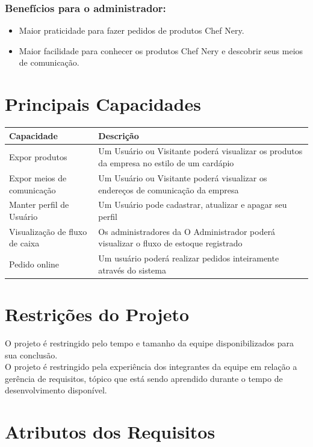 \begin{apendicesenv}
\begin{itemize}
\end{itemize}

\subsubsection{Benefícios para o administrador:}
\begin{itemize}

\item Maior praticidade para fazer pedidos de produtos Chef Nery.
\item Maior facilidade para conhecer os produtos Chef Nery e descobrir seus meios de comunicação.

\end{itemize}


{\large {\section { Principais Capacidades } } }

\begin{tabular}{|l|p{3in}|}
  \hline
  \textbf{Capacidade} & \textbf{Descrição} \\ \hline
  Expor produtos & Um Usuário ou Visitante poderá visualizar os produtos da empresa no estilo de um cardápio \\ \hline
  Expor meios de comunicação & Um Usuário ou Visitante poderá visualizar os endereços de comunicação da empresa \\ \hline
  Manter perfil de Usuário & Um Usuário pode cadastrar, atualizar e apagar seu perfil \\ \hline
  Visualização de fluxo de caixa & Os administradores da O Administrador poderá visualizar o fluxo de estoque registrado \\ \hline
  Pedido online & Um usuário poderá realizar pedidos inteiramente através do sistema \\ \hline

\end{tabular}
{\large {\section { Restrições do Projeto\\ } } }

O projeto é restringido pelo tempo e tamanho da equipe disponibilizados para sua conclusão.\\
\tab O projeto é restringido pela experiência dos integrantes da equipe em relação a gerência de requisitos, tópico que está sendo aprendido durante o tempo de desenvolvimento disponível.\\
{\large {\section { Atributos dos Requisitos\\ } } }


\end{apendicesenv}
